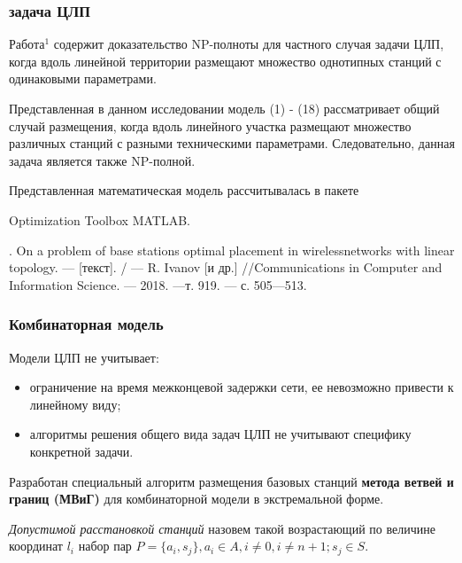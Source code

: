 \begin{frame}
    \frametitle{задача ЦЛП}
    \justifying
    
    Работа$^1$ содержит доказательство NP-полноты для частного случая задачи ЦЛП, когда вдоль линейной территории размещают множество однотипных станций с одинаковыми параметрами. 
    \bigskip
    
    Представленная в данном исследовании модель (1) - (18) рассматривает общий случай размещения, когда вдоль линейного участка размещают множество различных станций с разными техническими параметрами. Следовательно, данная задача является также NP-полной.
    \bigskip

    Представленная математическая модель рассчитывалась в пакете 
    
    Optimization Toolbox MATLAB.
    \bigskip

    \bigskip
    \bigskip
    \begin{minipage}[b]{0.99\linewidth}
        \fontsize{6pt}{7.2}. On a problem of base stations optimal placement in wirelessnetworks with linear topology. — [текст]. / — R. Ivanov [и др.] //Communications in Computer and Information Science. — 2018. —т. 919. — с. 505—513.
    \end{minipage}

\end{frame}

\begin{frame}
    \frametitle{Комбинаторная модель}
    \justifying
    Модели ЦЛП не учитывает:
    \begin{itemize}
        \item ограничение на время межконцевой задержки сети, ее невозможно привести к линейному виду;
        \item алгоритмы решения общего вида задач ЦЛП не учитывают специфику конкретной задачи.
    \end{itemize}
    

    \bigskip
    Разработан специальный алгоритм размещения базовых станций \textbf{метода ветвей и границ (МВиГ)} для комбинаторной модели в экстремальной форме.

    \bigskip
    \textit{Допустимой расстановкой станций} назовем такой возрастающий по величине координат $l_i$  набор пар $P = \{a_i, s_j\},a_i \in A,i \neq 0,i \neq n+1;s_j \in S$.

\end{frame}

